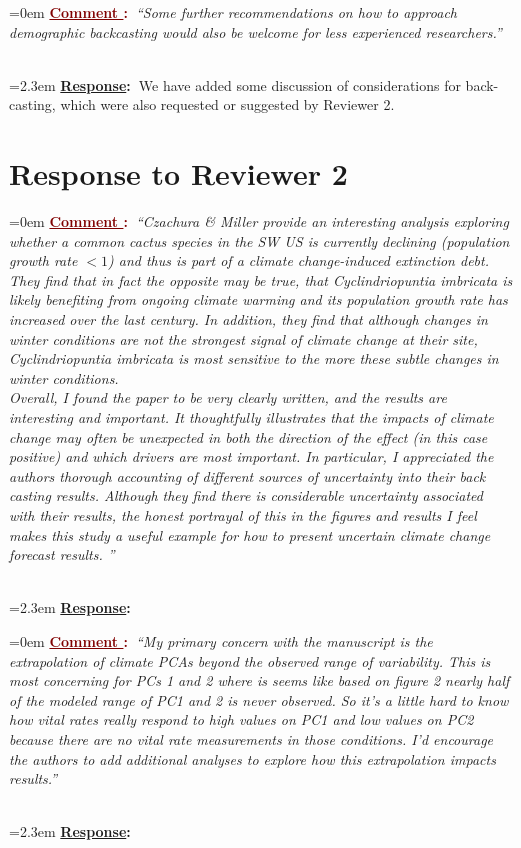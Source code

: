 \documentclass[12pt]{article}
\newcounter{cN}
\newcommand{\comment}[1]{
	\vspace{2em}
	\refstepcounter{cN} %
	\noindent \hangindent=0em \textbf{\textcolor{Maroon}{\uline{Comment \thecN}:~}}\emph{``#1''}
	}
\newcommand{\response}[1]{
	\\[0.25em]
	\hangindent=2.3em \textbf{\textcolor{NavyBlue}{\uline{Response}:~}}#1
	}
\begin{document}
\comment{Some further recommendations on how to approach demographic backcasting would also be welcome for less experienced researchers.}
\response{We have added some discussion of considerations for back-casting, which were also requested or suggested by Reviewer 2.}

\section{Response to Reviewer 2}
\vspace{-2em}

\comment{Czachura \& Miller provide an interesting analysis exploring whether a common cactus species in the SW US is currently declining (population growth rate $<1$) and thus is part of a climate change-induced extinction debt. They find that in fact the opposite may be true, that Cyclindriopuntia imbricata is likely benefiting from ongoing climate warming and its population growth rate has increased over the last century. In addition, they find that although changes in winter conditions are not the strongest signal of climate change at their site, Cyclindriopuntia imbricata is most sensitive to the more these subtle changes in winter conditions. 
\\
Overall, I found the paper to be very clearly written, and the results are interesting and important. It thoughtfully illustrates that the impacts of climate change may often be unexpected in both the direction of the effect (in this case positive) and which drivers are most important.  In particular, I appreciated the authors thorough accounting of different sources of uncertainty into their back casting results. Although they find there is considerable uncertainty associated with their results, the honest portrayal of this in the figures and results I feel makes this study a useful example for how to present uncertain climate change forecast results. 
}
\response{}

\comment{My primary concern with the manuscript is the extrapolation of climate PCAs beyond the observed range of variability. This is most concerning for PCs 1 and 2 where is seems like based on figure 2 nearly half of the modeled range of PC1 and 2 is never observed. So it’s a little hard to know how vital rates really respond to high values on PC1 and low values on PC2 because there are no vital rate measurements in those conditions. I’d encourage the authors to add additional analyses to explore how this extrapolation impacts results.}
\response{}
\end{document}
